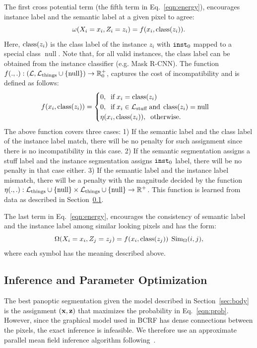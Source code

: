 The first cross potential term (the fifth term in Eq.~\eqref{eqn:energy}), encourages instance label and the semantic label at a given pixel to agree:
\begin{equation}
\omega(X_i = x_i, Z_i = z_i) = f(x_i, \operatorname{class}(z_i)).
\end{equation}
Here, $\operatorname{class}(z_i)$ is the class label of the instance $z_i$ with $\texttt{inst}_0$ mapped to a special class $\operatorname{null}$. Note that, for all valid instances, the class label can be obtained from the instance classifier (e.g. Mask R-CNN). The function $f(., .): (\mathcal{L}, \mathcal{L}_{\operatorname{things}} \cup \{\operatorname{{null}}\}) \to \mathbb{R}^+_0$, captures the cost of incompatibility and is defined as follows: 
\begin{equation}
\label{eqn:cross_compat}
f(x_i, \operatorname{class}(z_i)) = \begin{cases}
0,\;\;\text{if}\;x_i = \operatorname{class}(z_i)\\
0,\;\;\text{if}\;x_i \in \mathcal{L}_{\text{stuff}}\;\text{and}\;\operatorname{class}(z_i) = \operatorname{null}\\
\eta(x_i, \operatorname{class}(z_i)),\;\; \text{otherwise}.
\end{cases}
\end{equation}
The above function covers three cases: 1) If the semantic label and the class label of the instance label match, there will be no penalty for such assignment since there is no incompatibility in this case. 2) If the semantic segmentation assigns a stuff label and the instance segmentation assigns $\texttt{inst}_0$ label, there will be no penalty in that case either. 3) If the semantic label and the instance label mismatch, there will be a penalty with the magnitude decided by the function $\eta(., .): \mathcal{L}_{\operatorname{things}} \cup \{\operatorname{null}\} \times \mathcal{L}_{\operatorname{things}} \cup \{\operatorname{null}\} \to \mathbb{R}^+$. This function is learned from data as described in Section~\ref{sec:infer}.

The last term in Eq.~\eqref{eqn:energy}, encourages the consistency of semantic label and the instance label among similar looking pixels and has the form:
\begin{equation}
\Omega(X_i = x_i, Z_j = z_j) = f(x_i, \operatorname{class}(z_j))\; \operatorname{Sim_\Omega}(i, j),
\end{equation}
where each symbol has the meaning described above.


\subsection{Inference and Parameter Optimization}
\label{sec:infer}
The best panoptic segmentation given the model described in Section~\ref{sec:body} is the assignment $(\mathbf{x}, \mathbf{z})$ that maximizes the probability in Eq.~\eqref{eqn:prob}. However, since the graphical model used in BCRF has dense connections between the pixels, the exact inference is infeasible. We therefore use an approximate parallel mean field inference algorithm following~\cite{densecrf}.

